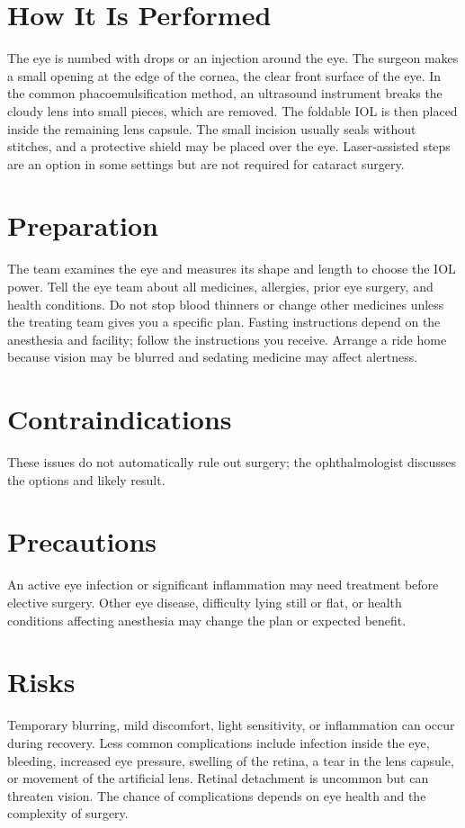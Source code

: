 \section*{How It Is Performed}
The eye is numbed with drops or an injection around the eye. The surgeon makes a small opening at the edge of the cornea, the clear front surface of the eye. In the common phacoemulsification method, an ultrasound instrument breaks the cloudy lens into small pieces, which are removed. The foldable IOL is then placed inside the remaining lens capsule. The small incision usually seals without stitches, and a protective shield may be placed over the eye. Laser-assisted steps are an option in some settings but are not required for cataract surgery.

\section*{Preparation}
The team examines the eye and measures its shape and length to choose the IOL power. Tell the eye team about all medicines, allergies, prior eye surgery, and health conditions. Do not stop blood thinners or change other medicines unless the treating team gives you a specific plan. Fasting instructions depend on the anesthesia and facility; follow the instructions you receive. Arrange a ride home because vision may be blurred and sedating medicine may affect alertness.

\section*{Contraindications}
These issues do not automatically rule out surgery; the ophthalmologist discusses the options and likely result.

\section*{Precautions}
An active eye infection or significant inflammation may need treatment before elective surgery. Other eye disease, difficulty lying still or flat, or health conditions affecting anesthesia may change the plan or expected benefit.

\section*{Risks}
Temporary blurring, mild discomfort, light sensitivity, or inflammation can occur during recovery. Less common complications include infection inside the eye, bleeding, increased eye pressure, swelling of the retina, a tear in the lens capsule, or movement of the artificial lens. Retinal detachment is uncommon but can threaten vision. The chance of complications depends on eye health and the complexity of surgery.

